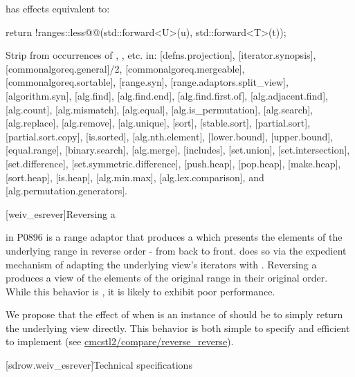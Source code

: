 \begin{itemdescr}
\pnum
{} has effects equivalent to:
\begin{codeblock}
return !ranges::less@\removed{<>}@{}(std::forward<U>(u), std::forward<T>(t));
\end{codeblock}
\end{itemdescr}

Strip \tcode{<>} from occurrences of ,
, etc. in: [defns.projection], [iterator.synopsis],
[commonalgoreq.general]/2, [commonalgoreq.mergeable], [commonalgoreq.sortable],
[range.syn], [range.adaptors.split_view], [algorithm.syn], [alg.find],
[alg.find.end], [alg.find.first.of], [alg.adjacent.find], [alg.count],
[alg.mismatch], [alg.equal], [alg.is_permutation], [alg.search], [alg.replace],
[alg.remove], [alg.unique], [sort], [stable.sort], [partial.sort],
[partial.sort.copy], [is.sorted], [alg.nth.element], [lower.bound],
[upper.bound], [equal.range], [binary.search], [alg.merge], [includes],
[set.union], [set.intersection], [set.difference], [set.symmetric.difference],
[push.heap], [pop.heap], [make.heap], [sort.heap], [is.heap], [alg.min.max],
[alg.lex.comparison], and [alg.permutation.generators].


[weiv_esrever]{Reversing a }

 in P0896 is a range adaptor that produces a
 which presents the elements of the underlying range
in reverse order - from back to front.  does so via
the expedient mechanism of adapting the underlying view's iterators with
. Reversing a  produces a view
of the elements of the original range in their original order. While this
behavior is , it is likely to exhibit poor performance.

We propose that the effect of  when  is an
instance of  should be to simply return the underlying view
directly. This behavior is both simple to specify and efficient to implement
(see \href{https://github.com/CaseyCarter/cmcstl2/compare/reverse_reverse}{cmcstl2/compare/reverse_reverse}).

[sdrow.weiv_esrever]{Technical specifications}

